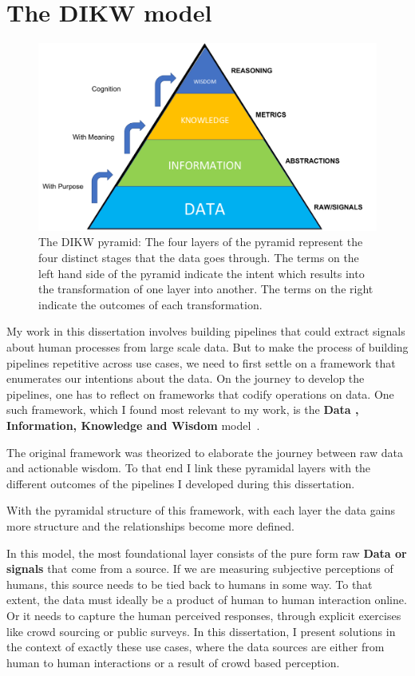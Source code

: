 \section{The DIKW model}

\begin{figure}[t!]
    \centering
    \includegraphics[width=\columnwidth]{DIKW.pdf}
    \caption{The DIKW pyramid: The four layers of the pyramid represent the four distinct stages that the data goes through. The terms on the left hand side of the pyramid indicate the intent which results into the transformation of one layer into another. The terms on the right indicate the outcomes of each transformation.}
    \label{fig:dikw}
\end{figure}
My work in this dissertation involves building pipelines that could extract signals about human processes from large scale data. But to make the process of building pipelines repetitive across use cases, we need to first settle on a framework that enumerates our intentions about the data.  
On the journey to develop the pipelines, one has to reflect on frameworks that codify operations on data. One such framework, which I found most relevant to my work, is the \textbf{Data , Information, Knowledge and Wisdom} model~\cite{rowley2007wisdom}.

The original framework was theorized to elaborate the journey between raw data and actionable wisdom. To that end I link these pyramidal layers with the different outcomes of the pipelines I developed during this dissertation.

With the pyramidal structure of this framework, with each layer the data gains more structure and the relationships become more defined. 

In this model, the most foundational layer consists of the pure form raw \textbf{Data or signals} that come from a source. If we are measuring subjective perceptions of humans, this source needs to be tied back to humans in some way. To that extent, the data must ideally be a product of human to human interaction online. Or it needs to capture the human perceived responses, through explicit exercises like crowd sourcing or public surveys. In this dissertation, I present solutions in the context of exactly these use cases, where the data sources are either from human to human interactions or a result of crowd based perception. 

